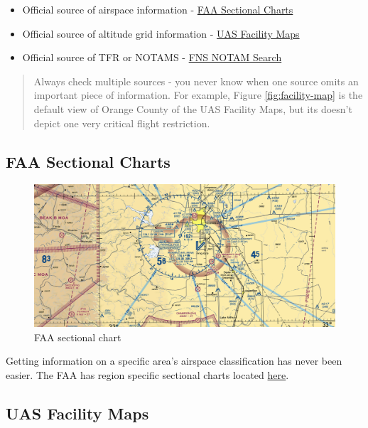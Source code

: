 \documentclass[
]{book}
\providecommand{\tightlist}{%
  \setlength{\itemsep}{0pt}\setlength{\parskip}{0pt}}
\begin{document}
\begin{itemize}
\tightlist
\item
  Official source of airspace information - \href{https://www.faa.gov/air_traffic/flight_info/aeronav/digital_products/vfr/}{FAA Sectional Charts}
\item
  Official source of altitude grid information - \href{https://faa.maps.arcgis.com/apps/webappviewer/index.html?id=9c2e4406710048e19806ebf6a06754ad}{UAS Facility Maps}
\item
  Official source of TFR or NOTAMS - \href{https://notams.aim.faa.gov/notamSearch/nsapp.html\#/}{FNS NOTAM Search}
\end{itemize}

\begin{quote}
Always check multiple sources - you never know when one source omits an important piece of information. For example, Figure \ref{fig:facility-map} is the default view of Orange County of the UAS Facility Maps, but its doesn't depict one very critical flight restriction.
\end{quote}

\hypertarget{faa-sectional-charts}{%
\subsection{FAA Sectional Charts}\label{faa-sectional-charts}}

\begin{figure}
\centering
\includegraphics{images/FAA-VFR.png}
\caption{FAA sectional chart}
\end{figure}

Getting information on a specific area's airspace classification has never been easier. The FAA has region specific sectional charts located \href{https://www.faa.gov/air_traffic/flight_info/aeronav/digital_products/vfr/}{here}.

\hypertarget{uas-facility-maps}{%
\subsection{UAS Facility Maps}\label{uas-facility-maps}}
\end{document}

